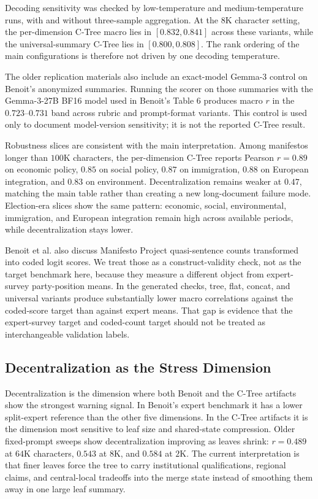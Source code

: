 Decoding sensitivity was checked by low-temperature and medium-temperature
runs, with and without three-sample aggregation. At the \(8\mathrm{K}\)
character setting, the per-dimension C-Tree macro lies in
\([0.832,0.841]\) across these variants, while the universal-summary C-Tree
lies in \([0.800,0.808]\). The rank ordering of the main configurations is
therefore not driven by one decoding temperature.

The older replication materials also include an exact-model Gemma-3 control on
Benoit's anonymized summaries. Running the scorer on those summaries with the
Gemma-3-27B BF16 model used in Benoit's Table 6 produces macro \(r\) in the
\(0.723\)--\(0.731\) band across rubric and prompt-format variants. This
control is used only to document model-version sensitivity; it is not the
reported C-Tree result.

Robustness slices are consistent with the main interpretation. Among
manifestos longer than \(100\mathrm{K}\) characters, the per-dimension C-Tree
reports Pearson \(r=0.89\) on economic policy, \(0.85\) on social policy,
\(0.87\) on immigration, \(0.88\) on European integration, and \(0.83\) on
environment. Decentralization remains weaker at \(0.47\), matching the main
table rather than creating a new long-document failure mode. Election-era
slices show the same pattern: economic, social, environmental, immigration,
and European integration remain high across available periods, while
decentralization stays lower.

Benoit et al. also discuss Manifesto Project quasi-sentence counts transformed
into coded logit scores. We treat those as a construct-validity check, not as
the target benchmark here, because they measure a different object from
expert-survey party-position means. In the generated checks, tree, flat,
concat, and universal variants produce substantially lower macro correlations
against the coded-score target than against expert means. That gap is evidence
that the expert-survey target and coded-count target should not be treated as
interchangeable validation labels.

\subsection{Decentralization as the Stress Dimension}

Decentralization is the dimension where both Benoit and the C-Tree artifacts
show the strongest warning signal. In Benoit's expert benchmark it has a lower
split-expert reference than the other five dimensions. In the C-Tree artifacts
it is the dimension most sensitive to leaf size and shared-state compression.
Older fixed-prompt sweeps show decentralization improving as leaves shrink:
\(r=0.489\) at \(64\mathrm{K}\) characters, \(0.543\) at \(8\mathrm{K}\), and
\(0.584\) at \(2\mathrm{K}\). The current interpretation is that finer leaves force
the tree to carry institutional qualifications, regional claims, and
central-local tradeoffs into the merge state instead of smoothing them away in
one large leaf summary.

